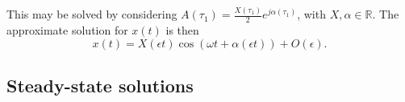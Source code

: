 \documentclass[11pt,twoside,a4paper,english]{book}
\begin{document}
This may be solved by considering $A(\tau_1) = \frac{X(\tau_1)}{2} e^{j\alpha(\tau_1)}$, with $X,\alpha \in \mathbb{R}$. 
The approximate solution for $x(t)$ is then
\begin{equation}
x(t) = X(\epsilon t) \cos(\omega t + \alpha(\epsilon t)) + O(\epsilon).
\end{equation} 


\subsection{Steady-state solutions}
\end{document}
